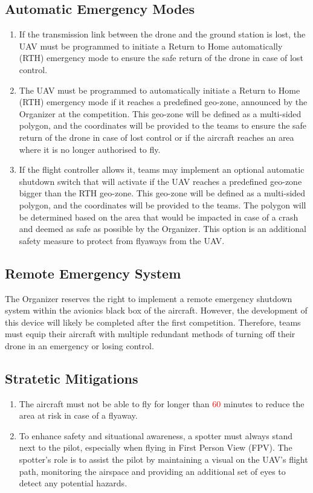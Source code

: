 \documentclass{article}
\begin{document}
\subsection{Automatic Emergency Modes}
\begin{enumerate}
  \item If the transmission link between the drone and the ground station is lost, the UAV must be programmed to initiate a Return to Home automatically (RTH) emergency mode to ensure the safe return of the drone in case of lost control.
  \item The UAV must be programmed to automatically initiate a Return to Home (RTH) emergency mode if it reaches a predefined geo-zone, announced by the Organizer at the competition. This geo-zone will be defined as a multi-sided polygon, and the coordinates will be provided to the teams to ensure the safe return of the drone in case of lost control or if the aircraft reaches an area where it is no longer authorised to fly.
  \item If the flight controller allows it, teams may implement an optional automatic shutdown switch that will activate if the UAV reaches a predefined geo-zone bigger than the RTH geo-zone. This geo-zone will be defined as a multi-sided polygon, and the coordinates will be provided to the teams. The polygon will be determined based on the area that would be impacted in case of a crash and deemed as safe as possible by the Organizer. This option is an additional safety measure to protect from flyaways from the UAV.
\end{enumerate}


\subsection{Remote Emergency System}
The Organizer reserves the right to implement a remote emergency shutdown system within the avionics black box of the aircraft. However, the development of this device will likely be completed after the first competition. Therefore, teams must equip their aircraft with multiple redundant methods of turning off their drone in an emergency or losing control.

\subsection{Stratetic Mitigations}
\begin{enumerate}
  \item The aircraft must not be able to fly for longer than \textcolor{red}{60} minutes to reduce the area at risk in case of a flyaway.
  \item To enhance safety and situational awareness, a spotter must always stand next to the pilot, especially when flying in First Person View (FPV). The spotter's role is to assist the pilot by maintaining a visual on the UAV's flight path, monitoring the airspace and providing an additional set of eyes to detect any potential hazards. 
\end{enumerate}
\end{document}
